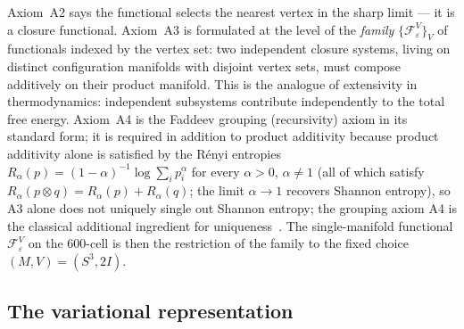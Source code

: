 \documentclass[12pt]{article}
\newcommand{\Fcal}{\mathcal{F}}
\begin{document}
Axiom~A2 says the functional selects the nearest vertex in the sharp
limit --- it is a closure functional. Axiom~A3 is formulated at the
level of the \textit{family} $\{\Fcal_\varepsilon^V\}_V$ of functionals
indexed by the vertex set: two independent closure systems, living on
distinct configuration manifolds with disjoint vertex sets, must
compose additively on their product manifold. This is the analogue of
extensivity in thermodynamics: independent subsystems contribute
independently to the total free energy. Axiom~A4 is the Faddeev
grouping (recursivity) axiom in its standard form; it is required in
addition to product additivity because product additivity alone is
satisfied by the R\'enyi entropies $R_\alpha(p) = (1-\alpha)^{-1}\log\sum_i p_i^\alpha$ for every $\alpha > 0$, $\alpha \neq 1$ (all of which satisfy $R_\alpha(p \otimes q) = R_\alpha(p) + R_\alpha(q)$; the limit $\alpha \to 1$ recovers Shannon entropy), so A3 alone does not uniquely single out Shannon entropy; the grouping axiom A4 is the classical additional ingredient for uniqueness~\citep{Faddeev1956}. The single-manifold functional $\Fcal_\varepsilon^V$ on the 600-cell is then the restriction of the family to the fixed choice $(M, V) = (S^3, 2I)$.

\subsection{The variational representation}
\end{document}

